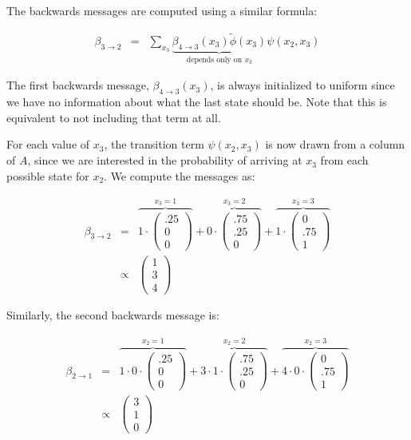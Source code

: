 \documentclass[6008notes.tex]{subfiles}
\begin{document}
The backwards messages are computed using a similar formula:

\begin{eqnarray*}
                \beta_{3 \to 2} &=& \sum_{x_3} \underbrace{\beta_{4 \to 3}(x_3) \tilde{\phi}(x_3)}_{\text{depends only on $x_3$}} \psi(x_2,x_3)
\end{eqnarray*}
						
The first backwards message, $\beta _{4 \to 3}(x_3)$, is always initialized to uniform since we have no information about what the last state should be. Note that this is equivalent to not including that term at all.

For each value of $x_3$, the transition term $\psi (x_2,x_3)$ is now drawn from a column of $A$, since we are interested in the probability of arriving at $x_3$ from each possible state for $x_2$. We compute the messages as:

\begin{eqnarray*}
		\beta_{3 \to 2} &= &
				\overbrace{1 \cdot \begin{pmatrix} .25 \\ 0 \\ 0 \end{pmatrix}}^{x_3 = 1} +
				\overbrace{0 \cdot \begin{pmatrix} .75 \\ .25 \\ 0 \end{pmatrix}}^{x_3 = 2} +
				\overbrace{1 \cdot \begin{pmatrix} 0 \\ .75 \\ 1 \end{pmatrix}}^{x_3 = 3} \\
		&\propto& \begin{pmatrix} 1 \\ 3 \\ 4 \end{pmatrix}
\end{eqnarray*}

Similarly, the second backwards message is:

\begin{eqnarray*}
		\beta_{2 \to 1} &= &
		\overbrace{1 \cdot 0 \cdot \begin{pmatrix} .25 \\ 0 \\ 0 \end{pmatrix}}^{x_2 = 1} +
		\overbrace{3 \cdot 1 \cdot \begin{pmatrix} .75 \\ .25 \\ 0 \end{pmatrix}}^{x_2 = 2} +
		\overbrace{4 \cdot 0 \cdot \begin{pmatrix} 0 \\ .75 \\ 1 \end{pmatrix}}^{x_2 = 3} \\
		&\propto& \begin{pmatrix} 3 \\ 1 \\ 0 \end{pmatrix}
\end{eqnarray*}
\end{document}
